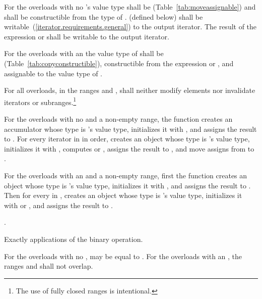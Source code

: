 \begin{itemdescr}
\pnum
\requires
For the overloads with no  's value
type shall be  (Table~\ref{tab:moveassignable}) and shall
be constructible from the type of .  (defined below)
shall be writable~(\ref{iterator.requirements.general}) to the 
output iterator.  The result of the expression  or
 shall be writable to the  output iterator.

\pnum
For the overloads with an  the value type of
shall be  (Table~\ref{tab:copyconstructible}),
constructible from the expression  or
, and assignable to the value type of
.

\pnum
For all overloads, in the ranges
and
,
shall neither modify elements nor invalidate iterators or
subranges.\footnote{The use of fully closed ranges is intentional.}

\pnum
\effects For the overloads with no  and a non-empty range,
the function creates an accumulator  whose type is 's
value type, initializes it with ,
and assigns the result to . For every iterator  in 
in order, creates an object  whose type is 's value type, initializes it
with , computes  or , assigns the result
to , and move assigns from  to .

\pnum
For the overloads with an  and a non-empty range, first the
function creates an object whose type is 's value type,
initializes it with , and assigns the result to .
Then for every 
in , creates an object  whose type is
's value type, initializes it with
 or
, and assigns the result to
.

\pnum
\returns
{}.

\pnum
\complexity
Exactly
applications of
the binary operation.

\pnum
\remarks
For the overloads with no ,  may be equal
to .  For the overloads with an , the ranges
 and  shall not overlap.
\end{itemdescr}

